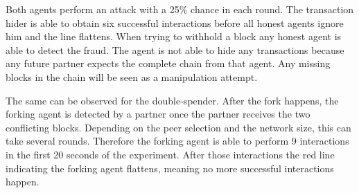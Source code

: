 Both agents perform an attack with a 25\% chance in each round.
The transaction hider is able to obtain six successful interactions before all honest agents ignore him and the line flattens. When trying to withhold a block any honest agent is able to detect the fraud. The agent is not able to hide any transactions because any future partner expects the complete chain from that agent. Any missing blocks in the chain will be seen as a manipulation attempt.

The same can be observed for the double-spender. After the fork happens, the forking agent is detected by a partner 
once the partner receives the two conflicting blocks. Depending on the peer selection and the network size, this can 
take several rounds. Therefore the forking agent is able to perform 9 interactions in the first 20 
seconds of the experiment. After those interactions the red line indicating the forking agent 
flattens, meaning no more successful interactions happen. 

